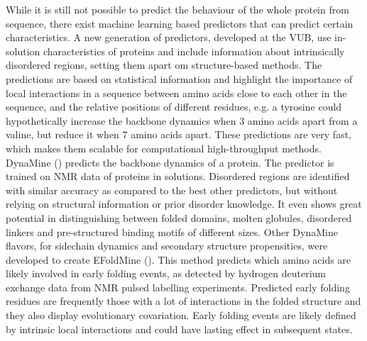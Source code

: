 While it is still not possible to predict the behaviour of the whole protein from sequence, 
there exist machine learning based predictors that can predict certain characteristics. 
A new generation of predictors, developed at the VUB, 
use in-solution characteristics of proteins and include information about intrinsically disordered regions, setting them apart om structure-based methods. 
The predictions are based on statistical information and highlight the importance of local interactions in a sequence between amino acids close to each other in the sequence, and the relative positions of different residues, 
e.g. a tyrosine could hypothetically increase the backbone dynamics when 3 amino acids apart from a valine, 
but reduce it when 7 amino acids apart. 
These predictions are very fast, which makes them scalable for computational high-throughput methods. 
DynaMine (\cite{cilia2013}) predicts the backbone dynamics of a protein. 
The predictor is trained on NMR data of proteins in solutions. 
Disordered regions are identified with similar accuracy as compared to the best other predictors, 
but without relying on structural information or prior disorder knowledge.
It even shows great potential in distinguishing between folded domains, molten globules, disordered linkers and pre-structured binding motifs of different sizes. 
Other DynaMine flavors, for sidechain dynamics and secondary structure propensities, 
were developed to create EFoldMine (\cite{raimondi2017}). 
This method predicts which amino acids are likely involved in early folding events, as detected by hydrogen deuterium exchange data from NMR pulsed labelling experiments. 
Predicted early folding residues are frequently those with a lot of interactions in the folded structure and they also display evolutionary covariation. 
Early folding events are likely defined by intrinsic local interactions and could have lasting effect in subsequent states. 
